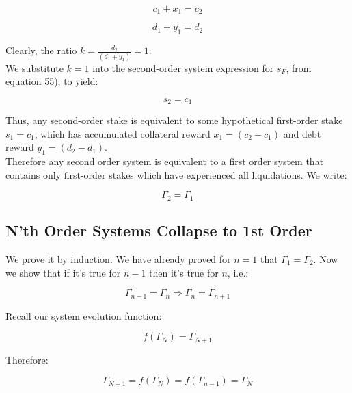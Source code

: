 \documentclass[reqno]{article}
\begin{document}
\begin{equation} 
    c_1+x_1=c_2
\end{equation}

\begin{equation} 
    d_1+y_1=d_2
\end{equation}

\bigskip
Clearly, the ratio  $k = \frac{d_2}{(d_1+y_1)} = 1$.\\

We substitute $k=1$ into the second-order system expression for $s_F$, from equation 55), to yield:

\begin{equation} 
    s_2=c_1
\end{equation}

\bigskip
Thus, any second-order stake is equivalent to some hypothetical first-order stake $s_1=c_1$, which has accumulated collateral reward $x_1=(c_2-c_1)$ and debt reward $y_1=(d_2-d_1)$.\\

Therefore any second order system is equivalent to a first order system that contains only first-order stakes which have experienced all liquidations. We write:

\begin{equation} 
    \Gamma_2=\Gamma_1
\end{equation}

\subsection{N’th Order Systems Collapse to 1st Order}
We prove it by induction. We have already proved for $n=1$ that $\Gamma_1=\Gamma_2$.
Now we show that if it’s true for $n-1$ then it’s true for $n$, i.e.:

\begin{equation}
    \Gamma_{n-1} = \Gamma_n \Rightarrow \Gamma_n = \Gamma_{n+1}
\end{equation}

Recall our system evolution function: 

\begin{equation} 
    f(\Gamma_N)=\Gamma_{N+1}
\end{equation}

Therefore:

\begin{equation} 
    \Gamma_{N+1} = f(\Gamma_N) = f(\Gamma_{n-1}) = \Gamma_N
\end{equation}
\end{document}

